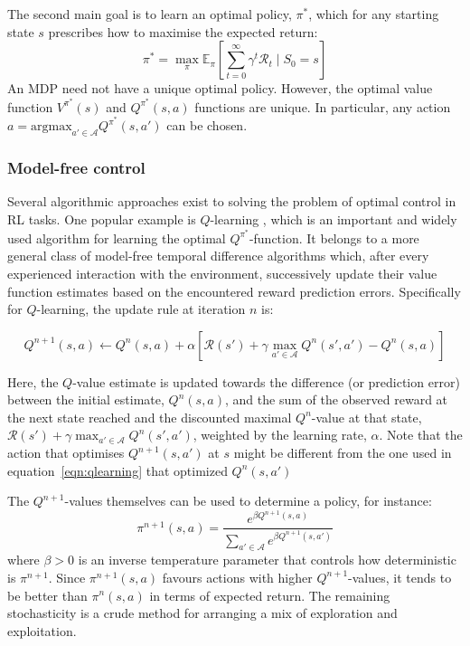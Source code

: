 The second main goal is to learn an optimal policy, $\pi^*$, which for any starting state $s$ prescribes how to maximise the expected return: 
\begin{equation}
    \pi^* = \max_{\pi} \mathbb{E}_{\pi}\left[ \sum_{t=0}^{\infty} \gamma^t \mathcal{R}_t \mid S_0 = s \right]
\end{equation}
An MDP need not have a unique optimal policy. However, the optimal value function $V^{\pi^*}(s)$ and $Q^{\pi^*}(s,a)$ functions are unique. In particular, any action $a=\text{argmax}_{a'\in \mathcal{A}}Q^{\pi^*}(s,a')$ can be chosen.

\subsubsection*{Model-free control}

Several algorithmic approaches exist to solving the problem of optimal control in RL tasks. One popular
example is $Q$-learning \parencite{watkinsQlearning1992a}, which is an important and widely used algorithm for learning the optimal $Q^{\pi^*}$-function. It belongs to a more general class of model-free temporal difference algorithms which, after every experienced interaction with the environment, successively update their value function estimates based on the encountered reward prediction errors. Specifically for $Q$-learning, the update rule at iteration $n$ is:

\begin{equation}
    Q^{n+1}(s, a) \leftarrow Q^{n}(s, a) + \alpha \left[\mathcal{R}(s') + \gamma \max_{a'\in\mathcal{A}} Q^{n}(s', a') - Q^{n}(s, a)\right]
    \label{eqn:qlearning}
\end{equation}

Here, the $Q$-value estimate is updated towards the difference (or prediction error) between the initial estimate, $Q^{n}(s, a)$, and the sum of the observed reward at the next state reached and the discounted maximal $Q^{n}$-value at that state, $\mathcal{R}(s') + \gamma \max_{a' \in \mathcal{A}}Q^{n}(s', a')$, weighted by the learning rate, $\alpha$. Note that the action that optimises $Q^{n+1}(s, a')$ at $s$ might be different from the one used in equation~\ref{eqn:qlearning} that optimized $Q^n(s, a')$

The $Q^{n+1}$-values themselves can be used to determine a  policy, for instance:
\begin{equation}
    \pi^{n+1}(s,a)=\frac{e^{\beta Q^{n+1}(s, a)}}{\sum_{a'\in\mathcal{A}} e^{\beta Q^{n+1}(s, a')}}
  \end{equation}
where $\beta>0$ is an inverse temperature parameter that controls how deterministic is $\pi^{n+1}$. Since $\pi^{n+1}(s,a)$ favours actions with higher $Q^{n+1}$-values, it tends to be better than $\pi^n(s,a)$ in terms of expected return. The remaining stochasticity is a crude method for arranging a mix of exploration and exploitation.

